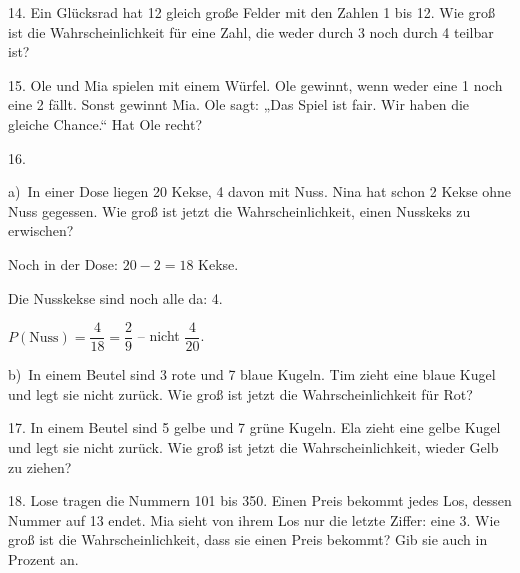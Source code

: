 \documentclass[11pt]{article}
\newcommand{\grau}[1]{{\color{mbgrau}#1}}
\begin{document}
\begin{pfaufg}{}{14.}{}
Ein Glücksrad hat 12 gleich große Felder mit den Zahlen 1 bis 12. Wie groß ist die Wahrscheinlichkeit für eine Zahl, die weder durch 3 noch durch 4 teilbar ist?
\end{pfaufg}

\begin{pfaufg}{}{15.}{}
Ole und Mia spielen mit einem Würfel. Ole gewinnt, wenn weder eine 1 noch eine 2 fällt. Sonst gewinnt Mia. Ole sagt: „Das Spiel ist fair. Wir haben die gleiche Chance.“ Hat Ole recht?
\end{pfaufg}

\begin{pfaufg}{}{16.}{}
\grau{a)\ In einer Dose liegen 20 Kekse, 4 davon mit Nuss. Nina hat schon 2 Kekse ohne Nuss gegessen. Wie groß ist jetzt die Wahrscheinlichkeit, einen Nusskeks zu erwischen?\par\smallskip Noch in der Dose: $20 - 2 = 18$ Kekse.\par Die Nusskekse sind noch alle da: 4.\par $P(\text{Nuss}) = \dfrac{4}{18} = \dfrac{2}{9}$ – nicht $\dfrac{4}{20}$.}
\par\medskip
b)\ In einem Beutel sind 3 rote und 7 blaue Kugeln. Tim zieht eine blaue Kugel und legt sie nicht zurück. Wie groß ist jetzt die Wahrscheinlichkeit für Rot?
\end{pfaufg}

\begin{pfaufg}{}{17.}{}
In einem Beutel sind 5 gelbe und 7 grüne Kugeln. Ela zieht eine gelbe Kugel und legt sie nicht zurück. Wie groß ist jetzt die Wahrscheinlichkeit, wieder Gelb zu ziehen?
\end{pfaufg}

\begin{pfaufg}{}{18.}{}
Lose tragen die Nummern 101 bis 350. Einen Preis bekommt jedes Los, dessen Nummer auf 13 endet. Mia sieht von ihrem Los nur die letzte Ziffer: eine 3. Wie groß ist die Wahrscheinlichkeit, dass sie einen Preis bekommt? Gib sie auch in Prozent an.
\end{pfaufg}
\end{document}
